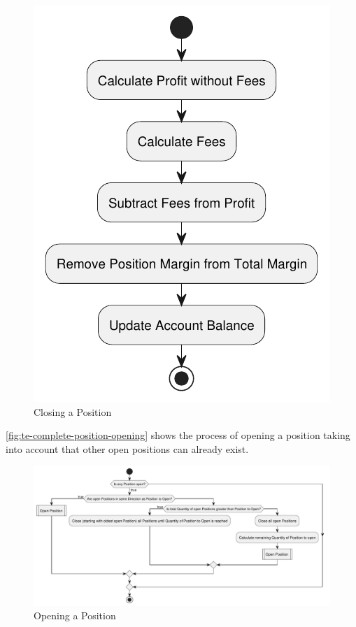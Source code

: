 \begin{figure}[H]
    \centering
    \includegraphics[width=\textwidth]{images/trading-engine/position-closing.pdf}
    \caption{Closing a Position}
    \label{fig:te-position-closing}
\end{figure}

\autoref{fig:te-complete-position-opening} shows the process of opening a position taking into account that other open positions can already exist.


\begin{figure}[H]
    \centering
    \includegraphics[width=\textwidth]{images/trading-engine/complete-position-opening.pdf}
    \caption{Opening a Position}
    \label{fig:te-complete-position-opening}
\end{figure}

